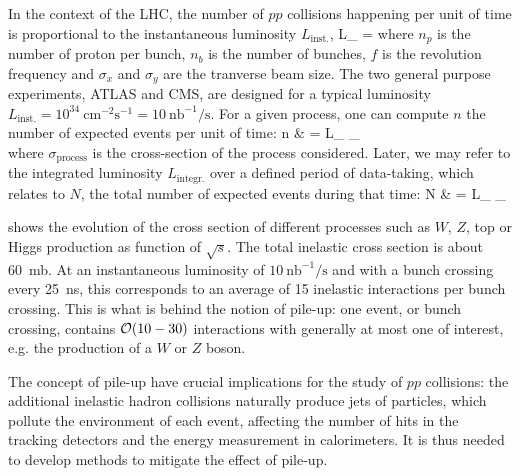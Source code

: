     In the context of the LHC, the number of $pp$ collisions happening per unit
    of time is proportional to the instantaneous luminosity $L_\text{inst.}$,
    {
        L_ = 
    }
    where $n_p$ is the number of proton per bunch, $n_b$ is the number of
    bunches, $f$ is the revolution frequency and $\sigma_x$ and $\sigma_y$ are
    the tranverse beam size.  The two general purpose experiments, ATLAS and
    CMS, are designed for a typical luminosity $L_\text{inst.} =
    10^{34}~\text{cm}^{-2} \text{s}^{-1} = 10~\text{nb}^{-1} / \text{s}$.  For a
    given process, one can compute $n$ the number of expected events per unit of
    time:
    {
        n & = L_ \times \sigma_ \\
    }
    where $\sigma_\text{process}$ is the cross-section of the process
    considered. Later, we may refer to the integrated luminosity
    $L_\text{integr.}$ over a defined period of data-taking, which relates to
    $N$, the total number of expected events during that time:
    {
        N & = L_ \times \sigma_
    }

     shows the evolution of the cross section of
    different processes such as $W$, $Z$, top or Higgs production as function of
    $\sqrt{s}$. The total inelastic cross section is about 60~mb. At an
    instantaneous luminosity of $10~\text{nb}^{-1} / \text{s}$ and with a bunch
    crossing every 25~ns, this corresponds to an average of 15 inelastic
    interactions per bunch crossing. This is what is behind the notion of
    pile-up: one event, or bunch crossing, contains $\mathcal{O}(10-30)$
    interactions with generally at most one of interest, e.g. the production of
    a $W$ or $Z$ boson.


    The concept of pile-up have crucial implications for the study of $pp$
    collisions: the additional inelastic hadron collisions naturally produce
    jets of particles, which pollute the environment of each event, affecting
    the number of hits in the tracking detectors and the energy measurement in
    calorimeters. It is thus needed to develop methods to mitigate the effect of
    pile-up.

